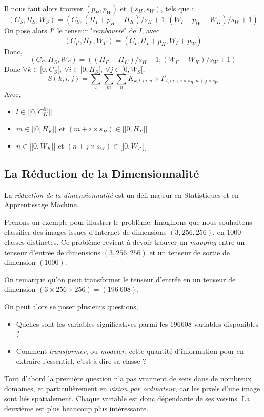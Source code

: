 \documentclass[a4paper, 10pt]{report}
\begin{document}
Il nous faut alors trouver $(p_H, p_W)$ et $(s_H, s_W)$, tels que :
$$(C_S, H_S, W_S) = (C_S, (H_I + p_H - H_K) / s_H + 1, (W_I + p_W - W_K) / s_W + 1)$$
On pose alors $I'$ le tenseur "\emph{rembourré}" de $I$, avec 
$$(C_{I'}, H_{I'}, W_{I'}) = (C_I, H_I + p_H, W_I + p_W)$$
Donc,
$$(C_S, H_S, W_S) = ((H_{I'} - H_K) / s_H + 1, (W_{I'} - W_K) / s_W + 1)$$
Donc $\forall k \in [0, C_S[, \ \forall i \in [0, H_S[, \ \forall j \in [0, W_S[$,
$$S(k, i, j) = \sum_{l}\sum_{m}\sum_{n}{K_{k, l, m, n} \times {I'}_{l, m + i \times s_H, n + j \times s_W}}$$
Avec,
\begin{itemize}
	\item $l \in [\![0, C_K^{in}[\![$
	\item $m \in [\![0, H_K[\![$ et $(m + i \times s_H) \in [\![0, H_{I'}[\![$
	\item $n \in [\![0, W_K[\![$ et $(n + j \times s_W) \in [\![0, W_{I'}[\![$
\end{itemize}
\subsection{La Réduction de la Dimensionnalité}
La \emph{réduction de la dimensionnalité} est un défi majeur en Statistiques et en Apprentissage Machine.

Prenons un exemple pour illustrer le problème.
Imaginons que nous souhaitons classifier des images issues d'Internet de dimensions $(3,256,256)$, en $1000$ classes distinctes.
Ce problème revient à devoir trouver un \emph{mapping} entre un tenseur d'entrée de dimensions $(3, 256, 256)$ et un tenseur de sortie de dimension $(1000)$.

On remarque qu'on peut transformer le tenseur d'entrée en un tenseur de dimension $(3 \times 256 \times 256) = (196\ 608)$.

On peut alors se poser plusieurs questions,
\begin{itemize}
	\item Quelles sont les variables significatives parmi les $196608$ variables disponibles ?
	\item Comment \emph{transformer}, ou \emph{modeler}, cette quantité d'information pour en extraire l'essentiel, c'est à dire sa classe ?
\end{itemize}

Tout d'abord la première question n'a pas vraiment de sens dans de nombreux domaines, et particulièrement en \emph{vision par ordinateur}, car les pixels d'une image sont liés spatialement. Chaque variable est donc dépendante de ses voisins.
La deuxième est plus beaucoup plus intéressante.
\end{document}
